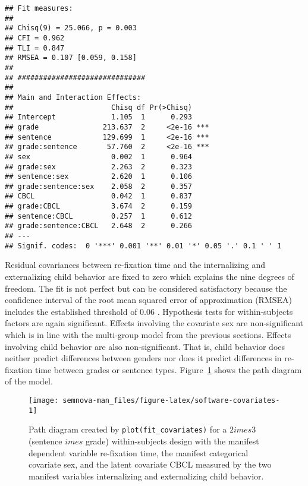 \documentclass[
]{book}
\begin{document}
\begin{verbatim}
## Fit measures:
## 
## Chisq(9) = 25.066, p = 0.003
## CFI = 0.962
## TLI = 0.847
## RMSEA = 0.107 [0.059, 0.158]
## 
## ##############################
## 
## Main and Interaction Effects:
##                       Chisq df Pr(>Chisq)    
## Intercept             1.105  1      0.293    
## grade               213.637  2     <2e-16 ***
## sentence            129.699  1     <2e-16 ***
## grade:sentence       57.760  2     <2e-16 ***
## sex                   0.002  1      0.964    
## grade:sex             2.263  2      0.323    
## sentence:sex          2.620  1      0.106    
## grade:sentence:sex    2.058  2      0.357    
## CBCL                  0.042  1      0.837    
## grade:CBCL            3.674  2      0.159    
## sentence:CBCL         0.257  1      0.612    
## grade:sentence:CBCL   2.648  2      0.266    
## ---
## Signif. codes:  0 '***' 0.001 '**' 0.01 '*' 0.05 '.' 0.1 ' ' 1
\end{verbatim}

Residual covariances between re-fixation time and the internalizing and externalizing child behavior are fixed to zero which explains the nine degrees of freedom. The fit is not perfect but can be considered satisfactory because the confidence interval of the root mean squared error of approximation (RMSEA) includes the established threshold of 0.06 \citep[e.g.,][]{Hu1999a}. Hypothesis tests for within-subjects factors are again significant. Effects involving the covariate sex are non-significant which is in line with the multi-group model from the previous sections. Effects involving child behavior are also non-significant. That is, child behavior does neither predict differences between genders nor does it predict differences in re-fixation time between grades or sentence types. Figure~\ref{fig:software-covariates} shows the path diagram of the model.

\begin{figure}

{\centering \texttt{[image: semnova-man\_files/figure-latex/software-covariates-1]} 

}

\caption{Path diagram created by \texttt{plot(fit\_covariates)} for a $2    imes 3$ (sentence $ imes$ grade) within-subjects design with the manifest dependent variable re-fixation time, the manifest categorical covariate sex, and the latent covariate CBCL measured by the two manifest variables internalizing and externalizing child behavior.}\label{fig:software-covariates}
\end{figure}
\end{document}
